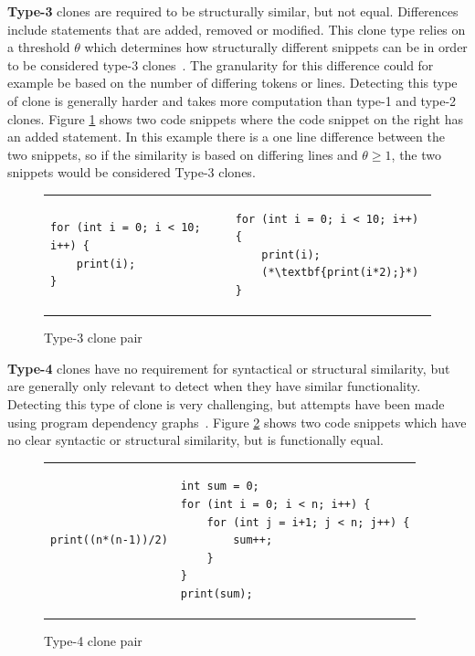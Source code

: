 \textbf{Type-3} clones are required to be structurally similar, but not equal. Differences
include statements that are added, removed or modified. This clone type relies on a
threshold $\theta$ which determines how structurally different snippets can be in order to
be considered type-3 clones~\cite[6]{Inoue_introduction_to_cc}. The granularity for this
difference could for example be based on the number of differing tokens or lines.
Detecting this type of clone is generally harder and takes more computation than type-1
and type-2 clones. Figure \ref{fig:type3clone} shows two code snippets where the code
snippet on the right has an added statement. In this example there is a one line
difference between the two snippets, so if the similarity is based on differing lines and
$\theta \geq 1$, the two snippets would be considered Type-3 clones.

\begin{figure}[t]
	\begin{center}
        \begin{tabular}{p{5cm} | p{5cm}}
			\begin{lstlisting}
for (int i = 0; i < 10; i++) {
    print(i);
}
\end{lstlisting} &
			\begin{lstlisting}
for (int i = 0; i < 10; i++) {
    print(i);
    (*\textbf{print(i*2);}*)
}
\end{lstlisting}
		\end{tabular}
	\end{center}
    \caption{Type-3 clone pair}
    \label{fig:type3clone}
\end{figure}



\textbf{Type-4} clones have no requirement for syntactical or structural similarity, but
are generally only relevant to detect when they have similar functionality. Detecting this
type of clone is very challenging, but attempts have been made using program dependency
graphs~\cite{SeedType4Detection}. Figure \ref{fig:type4clone} shows two code snippets
which have no clear syntactic or structural similarity, but is functionally equal.

\begin{figure}[t]
	\begin{center}
        \begin{tabular}{p{5cm} | p{5cm}}
			\begin{lstlisting}
print((n*(n-1))/2)
\end{lstlisting} &
			\begin{lstlisting}
int sum = 0;
for (int i = 0; i < n; i++) {
    for (int j = i+1; j < n; j++) {
        sum++;
    }
}
print(sum);
\end{lstlisting}
		\end{tabular}
	\end{center}
    \caption{Type-4 clone pair}
    \label{fig:type4clone}
\end{figure}



